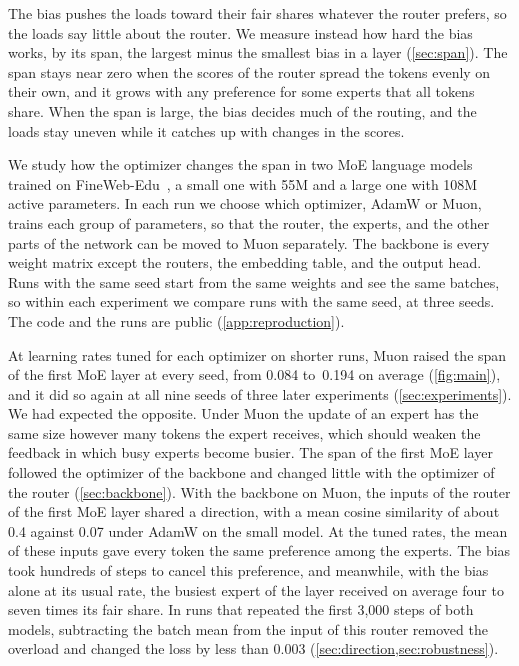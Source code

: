 \documentclass[11pt, a4paper]{article}
\begin{document}
The bias pushes the loads toward their fair shares whatever the router prefers, so the loads say little about the router. We measure instead how hard the bias works, by its span, the largest minus the smallest bias in a layer (\cref{sec:span}). The span stays near zero when the scores of the router spread the tokens evenly on their own, and it grows with any preference for some experts that all tokens share. When the span is large, the bias decides much of the routing, and the loads stay uneven while it catches up with changes in the scores.

We study how the optimizer changes the span in two MoE language models trained on FineWeb-Edu~\citep{penedo2024fineweb}, a small one with 55M and a large one with 108M active parameters. In each run we choose which optimizer, AdamW or Muon, trains each group of parameters, so that the router, the experts, and the other parts of the network can be moved to Muon separately. The backbone is every weight matrix except the routers, the embedding table, and the output head. Runs with the same seed start from the same weights and see the same batches, so within each experiment we compare runs with the same seed, at three seeds. The code and the runs are public (\cref{app:reproduction}).

At learning rates tuned for each optimizer on shorter runs, Muon raised the span of the first MoE layer at every seed, from 0.084 to~0.194 on average (\cref{fig:main}), and it did so again at all nine seeds of three later experiments (\cref{sec:experiments}). We had expected the opposite. Under Muon the update of an expert has the same size however many tokens the expert receives, which should weaken the feedback in which busy experts become busier. The span of the first MoE layer followed the optimizer of the backbone and changed little with the optimizer of the router (\cref{sec:backbone}). With the backbone on Muon, the inputs of the router of the first MoE layer shared a direction, with a mean cosine similarity of about 0.4 against 0.07 under AdamW on the small model. At the tuned rates, the mean of these inputs gave every token the same preference among the experts. The bias took hundreds of steps to cancel this preference, and meanwhile, with the bias alone at its usual rate, the busiest expert of the layer received on average four to seven times its fair share. In runs that repeated the first 3,000 steps of both models, subtracting the batch mean from the input of this router removed the overload and changed the loss by less than 0.003 (\cref{sec:direction,sec:robustness}).
\end{document}
